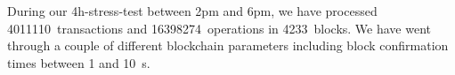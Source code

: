 During our 4h-stress-test between 2pm and 6pm, we have processed
\SI{4011110}{transactions} and \SI{16398274}{operations} in
\SI{4233}{blocks}. We have went through a couple of different blockchain
parameters including block confirmation times between \num{1} and
\SI{10}{s}.
